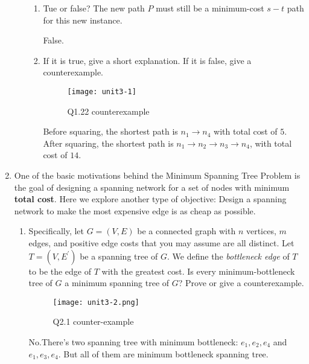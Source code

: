 \documentclass[14pt, a4paper]{article}
\begin{document}
\begin{enumerate}
\begin{enumerate}[label*=\arabic*]
        \begin{enumerate}[label*=\arabic*]
            \item  Tue or false? The new path $P$ must still be a minimum-cost $s - t$ 
            path for this new instance.
            
            False.
            
            \item If it is true, give a short explanation. If it is false, give a counterexample.
            
            \begin{figure}[h!]
            \centering
            \texttt{[image: unit3-1]}
            \caption{Q1.22 counterexample}
            \end{figure}
            
            Before squaring, the shortest path is $n_1 \to n_4$ with total cost of $5$. After squaring, 
            the shortest path is $n_1 \to n_2 \to n_3 \to n_4$, with total cost of $14$.
            
        \end{enumerate}
    \end{enumerate}

\item One of the basic motivations behind the Minimum Spanning Tree Problem is the goal of designing a spanning network for a set of nodes with minimum \textbf{total cost}. 
Here we explore another type of objective: Design a spanning network to make the most expensive edge is as cheap as possible. \\

    \begin{enumerate}[label*=\arabic*]
    \item Specifically, let $G = (V , E)$ be a connected graph with $n$ vertices, 
    $m$ edges, and positive edge costs that you may assume are all distinct. 
    Let $T = (V , E^{\prime})$ be a spanning tree of $G$. We define the \textit{bottleneck edge} of $T$ to be the edge of $T$ with the greatest cost. 
    Is every minimum-bottleneck tree of $G$ a minimum spanning tree of $G$? 
    Prove or give a counterexample. 
    
    \begin{figure}[h!]
    \centering
    \texttt{[image: unit3-2.png]}
    \caption{Q2.1 counter-example}
    \end{figure}
    
    No.There's two spanning tree with minimum bottleneck: $e_1, e_2, e_4$ and $e_1, e_3, e_4$. 
    But all of them are minimum bottleneck spanning tree.
    

\end{enumerate}
\end{enumerate}
\end{document}
